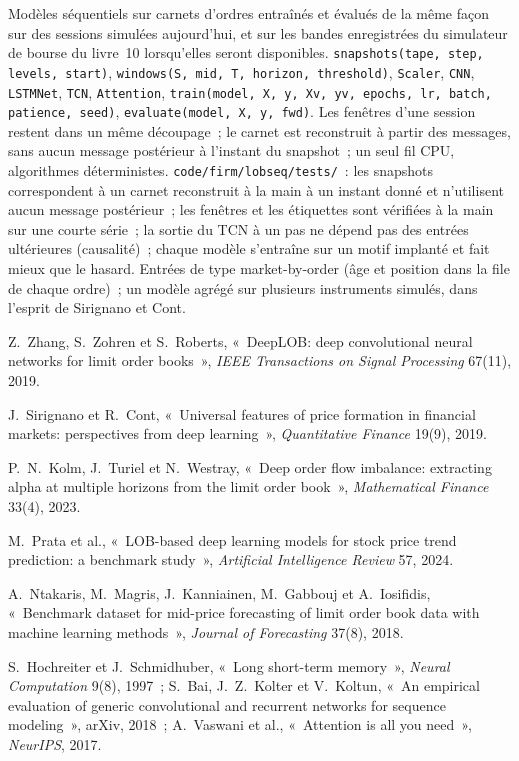 \begin{build}
 Modèles séquentiels sur carnets d'ordres entraînés et évalués de la même façon sur des sessions simulées aujourd'hui, et sur les
bandes enregistrées du simulateur de bourse du livre~10 lorsqu'elles seront disponibles.
 \texttt{snapshots(tape, step, levels, start)}, \texttt{windows(S, mid, T, horizon, threshold)},
\texttt{Scaler}, \texttt{CNN}, \texttt{LSTMNet}, \texttt{TCN}, \texttt{Attention},
\texttt{train(model, X, y, Xv, yv, epochs, lr, batch, patience, seed)}, \texttt{evaluate(model, X, y, fwd)}.
 Les fenêtres d'une session restent dans un même découpage~; le carnet est reconstruit à partir des messages, sans aucun message
postérieur à l'instant du snapshot~; un seul fil CPU, algorithmes déterministes.
 \texttt{code/firm/lobseq/tests/}~: les snapshots correspondent à un carnet reconstruit à la main à un instant donné et
n'utilisent aucun message postérieur~; les fenêtres et les étiquettes sont vérifiées à la main sur une courte série~; la sortie du TCN à un pas ne dépend pas des
entrées ultérieures (causalité)~; chaque modèle s'entraîne sur un motif implanté et fait mieux que le hasard.
 Entrées de type market-by-order (âge et position dans la file de chaque ordre)~; un modèle agrégé sur plusieurs
instruments simulés, dans l'esprit de Sirignano et Cont.
\end{build}

\begin{omsources}
\item Z.~Zhang, S.~Zohren et S.~Roberts, «~DeepLOB: deep convolutional neural networks for limit order books~»,
\emph{IEEE Transactions on Signal Processing} 67(11), 2019.
\item J.~Sirignano et R.~Cont, «~Universal features of price formation in financial markets: perspectives from deep
learning~», \emph{Quantitative Finance} 19(9), 2019.
\item P.~N.~Kolm, J.~Turiel et N.~Westray, «~Deep order flow imbalance: extracting alpha at multiple horizons from the
limit order book~», \emph{Mathematical Finance} 33(4), 2023.
\item M.~Prata et al., «~LOB-based deep learning models for stock price trend prediction: a benchmark study~»,
\emph{Artificial Intelligence Review} 57, 2024.
\item A.~Ntakaris, M.~Magris, J.~Kanniainen, M.~Gabbouj et A.~Iosifidis, «~Benchmark dataset for mid-price forecasting of
limit order book data with machine learning methods~», \emph{Journal of Forecasting} 37(8), 2018.
\item S.~Hochreiter et J.~Schmidhuber, «~Long short-term memory~», \emph{Neural Computation} 9(8), 1997~; S.~Bai, J.~Z.~Kolter
et V.~Koltun, «~An empirical evaluation of generic convolutional and recurrent networks for sequence modeling~», arXiv,
2018~; A.~Vaswani et al., «~Attention is all you need~», \emph{NeurIPS}, 2017.
\end{omsources}

